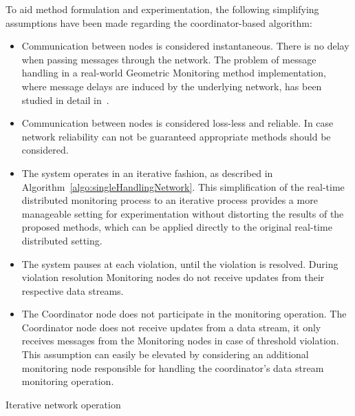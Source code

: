To aid method formulation and experimentation, the following simplifying assumptions have been made regarding the coordinator-based algorithm:
\begin{itemize}
\item Communication between nodes is considered instantaneous. There is no delay when passing messages through the network. The problem of message handling in a real-world Geometric Monitoring method implementation, where message delays are induced by the underlying network, has been studied in detail in~\cite{Babis2013SimulatorStreams}.

\item Communication between nodes is considered loss-less and reliable. In case network reliability can not be guaranteed appropriate methods should be considered.

\item The system operates in an iterative fashion, as described in Algorithm~\ref{algo:singleHandlingNetwork}. This simplification of the real-time distributed monitoring process to an iterative process provides a more manageable setting for experimentation without distorting the results of the proposed methods, which can be applied directly to the original real-time distributed setting.

\item The system pauses at each violation, until the violation is resolved. During violation resolution Monitoring nodes do not receive updates from their respective data streams.

\item The Coordinator node does not participate in the monitoring operation. The Coordinator node does not receive updates from a data stream, it only receives messages from the Monitoring nodes in case of threshold violation. This assumption can easily be elevated by considering an additional monitoring node responsible for handling the coordinator's data stream monitoring operation. 

\end{itemize}


\begin{algorithm}[H]


\SetAlgoLined
{}
\caption{Iterative network operation \label{algo:singleHandlingNetwork}} 
\end{algorithm}

